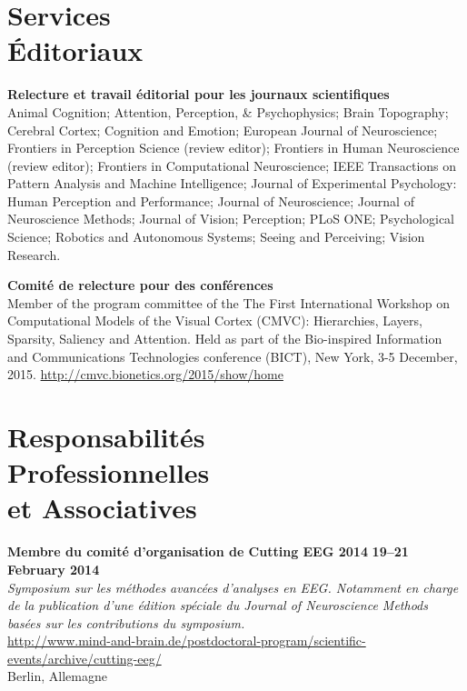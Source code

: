 \documentclass[margin,line]{resume}
\begin{document}
\begin{resume}
\vspace{3mm}
\section{\mysidestyle Services\\\'Editoriaux}
 
 \textbf{Relecture et travail éditorial pour les journaux scientifiques} \\
Animal Cognition; 
Attention, Perception, \& Psychophysics; 
Brain Topography;  
Cerebral Cortex; 
Cognition and Emotion;
European Journal of Neuroscience;
Frontiers in Perception Science (review editor); 
Frontiers in Human Neuroscience (review editor); 
Frontiers in Computational Neuroscience; 
IEEE Transactions on Pattern Analysis and Machine Intelligence;
Journal of Experimental Psychology: Human Perception and Performance;
Journal of Neuroscience;
Journal of Neuroscience Methods;
Journal of Vision;
Perception;
PLoS ONE; 
Psychological Science;
Robotics and Autonomous Systems;
Seeing and Perceiving;
Vision Research.

\textbf{Comité de relecture pour des conférences} \\
Member of the program committee of the The First International Workshop on Computational Models of the Visual Cortex (CMVC): Hierarchies, Layers, Sparsity, Saliency and Attention. Held as part of the Bio-inspired Information and Communications Technologies conference (BICT), New York, 3-5 December, 2015.
 \url{http://cmvc.bionetics.org/2015/show/home}

\vspace{3mm}
    \section{\mysidestyle Responsabilités\\ Professionnelles\\ et Associatives}

	\textbf{Membre du comité d'organisation de Cutting EEG 2014} \hfill \textbf{19--21 February 2014}\\
	\textsl{Symposium sur les méthodes avancées d'analyses en EEG. Notamment en charge de la publication d'une édition spéciale du Journal of Neuroscience Methods basées sur les contributions du symposium.}\\
	 \url{http://www.mind-and-brain.de/postdoctoral-program/scientific-events/archive/cutting-eeg/}\\
	Berlin, Allemagne


\end{resume}
\end{document}
